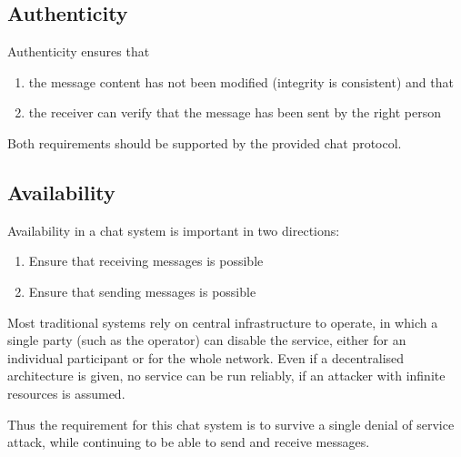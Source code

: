 \subsection{Authenticity}
Authenticity ensures that
\begin{enumerate}
\item the message content has not been modified (integrity is consistent) and that
\item the receiver can verify that the message has been sent by the right person
\end{enumerate}
Both requirements should be supported by the provided chat protocol.
\subsection{Availability}
Availability in a chat system is important in two directions:
\begin{enumerate}
\item Ensure that receiving messages is possible
\item Ensure that sending messages is possible
\end{enumerate}
Most traditional systems rely on central infrastructure to operate, in which a
single party (such as the operator) can disable the service, either for an individual
participant or for the whole network.
Even if a decentralised architecture is given,
no service can be run reliably, if an attacker with infinite resources is assumed.

Thus the requirement for this chat system is to survive
a single denial of service attack, while continuing to
be able to send and receive messages.

